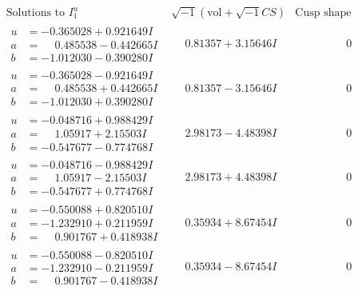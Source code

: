 \documentclass[1p]{elsarticle_modified}
\theoremstyle{definition}
\newcommand{\I}{\sqrt{-1}}
\begin{document}
$$\begin{array}{c|c|c}  
\text{Solutions to }I^u_{1}& \I (\text{vol} + \sqrt{-1}CS) & \text{Cusp shape}\\
 \hline 
\begin{aligned}
u &= -0.365028 + 0.921649 I \\
a &= \phantom{-}0.485538 - 0.442665 I \\
b &= -1.012030 - 0.390280 I\end{aligned}
 & \phantom{-}0.81357 + 3.15646 I & \phantom{-0.000000 } 0 \\ \hline\begin{aligned}
u &= -0.365028 - 0.921649 I \\
a &= \phantom{-}0.485538 + 0.442665 I \\
b &= -1.012030 + 0.390280 I\end{aligned}
 & \phantom{-}0.81357 - 3.15646 I & \phantom{-0.000000 } 0 \\ \hline\begin{aligned}
u &= -0.048716 + 0.988429 I \\
a &= \phantom{-}1.05917 + 2.15503 I \\
b &= -0.547677 - 0.774768 I\end{aligned}
 & \phantom{-}2.98173 - 4.48398 I & \phantom{-0.000000 } 0 \\ \hline\begin{aligned}
u &= -0.048716 - 0.988429 I \\
a &= \phantom{-}1.05917 - 2.15503 I \\
b &= -0.547677 + 0.774768 I\end{aligned}
 & \phantom{-}2.98173 + 4.48398 I & \phantom{-0.000000 } 0 \\ \hline\begin{aligned}
u &= -0.550088 + 0.820510 I \\
a &= -1.232910 + 0.211959 I \\
b &= \phantom{-}0.901767 + 0.418938 I\end{aligned}
 & \phantom{-}0.35934 + 8.67454 I & \phantom{-0.000000 } 0 \\ \hline\begin{aligned}
u &= -0.550088 - 0.820510 I \\
a &= -1.232910 - 0.211959 I \\
b &= \phantom{-}0.901767 - 0.418938 I\end{aligned}
 & \phantom{-}0.35934 - 8.67454 I & \phantom{-0.000000 } 0 \\ \hline\begin{aligned}

\end{aligned}
\end{array}$$
\end{document}
